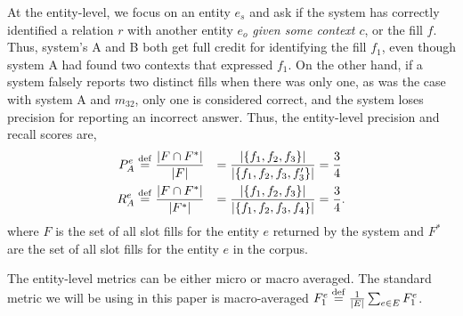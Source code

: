 At the entity-level, we focus on an entity $e_s$ and ask if the system has correctly identified a relation $r$ with another entity $e_o$ \textit{given some context $c$}, or the fill $f$.
Thus, system's A and B both get full credit for identifying the fill $f_1$, even though system A had found two contexts that expressed $f_1$.  
On the other hand, if a system falsely reports two distinct fills when there was only one, as was the case with system A and $m_{32}$, only one is considered correct, and the system loses precision for reporting an incorrect answer. 
Thus, the entity-level precision and recall scores are,
\begin{align*}
  P^e_A &\stackrel{\rm def}{=} \frac{|F \cap F^*|}{|F|} &= \frac{|\{f_{1}, f_{2}, f_{3}\}|}{|\{f_{1}, f_{2}, f_{3}, f_{3}'\}|} &= \frac{3}{4} \\
  R^e_A &\stackrel{\rm def}{=} \frac{|F \cap F^*|}{|F^*|} &= \frac{|\{f_{1}, f_{2}, f_{3}\}|}{|\{f_{1}, f_{2}, f_{3}, f_{4}\}|} &= \frac{3}{4}.
\end{align*}
where $F$ is the set of all slot fills for the entity $e$ returned by the system and $F^*$ are the set of all slot fills for the entity $e$ in the corpus.

The entity-level metrics can be either micro or macro averaged.
The standard metric we will be using in this paper is macro-averaged $F_1^e \stackrel{\rm def}{=} \frac{1}{|E|} \sum_{e \in E} F_1^{e}$.
